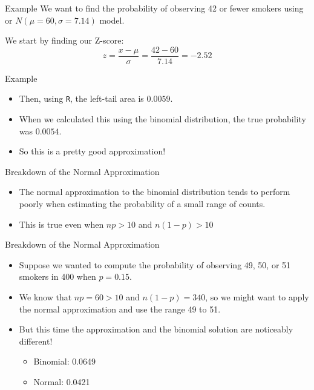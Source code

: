 \begin{frame}{Example}
    We want to find the probability of observing 42 or fewer smokers using or $N(\mu=60, \sigma=7.14)$ model. 
    
    \vspace{12pt}We start by finding our Z-score:
    \[
        z = \frac{x-\mu}{\sigma} = \frac{42-60}{7.14} = -2.52
    \]
\end{frame}

\begin{frame}{Example}
    \begin{itemize}
        \item Then, using \texttt{R}, the left-tail area is $0.0059$.
        \item When we calculated this using the binomial distribution, the true probability was $0.0054$.
        \item So this is a pretty good approximation!
    \end{itemize}
\end{frame}

\begin{frame}{Breakdown of the Normal Approximation}
    \begin{itemize}
        \item The normal approximation to the binomial distribution tends to perform poorly when estimating the probability of a small range of counts.
        \item This is true even when $np>10$ and $n(1-p)>10$
    \end{itemize}
\end{frame}

\begin{frame}{Breakdown of the Normal Approximation}
    \begin{itemize}
        \item Suppose we wanted to compute the probability of observing 49, 50, or 51 smokers in 400 when $p = 0.15$.
        \item We know that $np=60>10$ and $n(1-p)=340$, so we might want to apply the normal approximation and use the range 49 to 51.
        \item But this time the approximation and the binomial solution are noticeably different!
        \begin{itemize}
            \item Binomial: 0.0649
            \item Normal: 0.0421
        \end{itemize}
    \end{itemize}
\end{frame}

